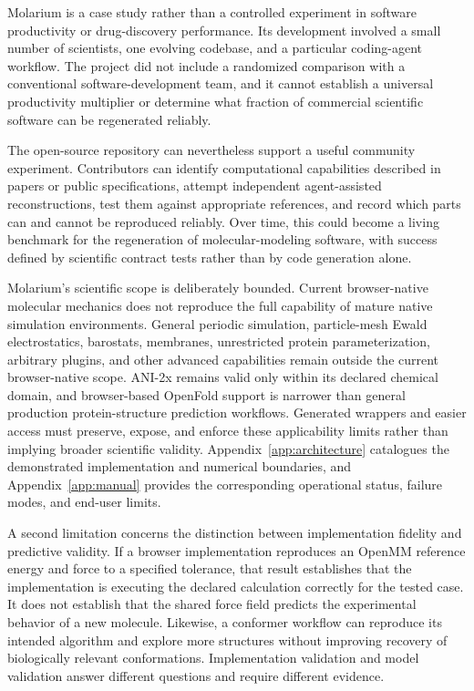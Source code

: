 \documentclass[11pt]{article}
\begin{document}
Molarium is a case study rather than a controlled experiment in software productivity or drug-discovery performance. Its development involved a small number of scientists, one evolving codebase, and a particular coding-agent workflow. The project did not include a randomized comparison with a conventional software-development team, and it cannot establish a universal productivity multiplier or determine what fraction of commercial scientific software can be regenerated reliably.

The open-source repository can nevertheless support a useful community experiment. Contributors can identify computational capabilities described in papers or public specifications, attempt independent agent-assisted reconstructions, test them against appropriate references, and record which parts can and cannot be reproduced reliably. Over time, this could become a living benchmark for the regeneration of molecular-modeling software, with success defined by scientific contract tests rather than by code generation alone.

Molarium's scientific scope is deliberately bounded. Current browser-native molecular mechanics does not reproduce the full capability of mature native simulation environments. General periodic simulation, particle-mesh Ewald electrostatics, barostats, membranes, unrestricted protein parameterization, arbitrary plugins, and other advanced capabilities remain outside the current browser-native scope. ANI-2x remains valid only within its declared chemical domain, and browser-based OpenFold support is narrower than general production protein-structure prediction workflows. Generated wrappers and easier access must preserve, expose, and enforce these applicability limits rather than implying broader scientific validity. Appendix~\ref{app:architecture} catalogues the demonstrated implementation and numerical boundaries, and Appendix~\ref{app:manual} provides the corresponding operational status, failure modes, and end-user limits.

A second limitation concerns the distinction between implementation fidelity and predictive validity. If a browser implementation reproduces an OpenMM reference energy and force to a specified tolerance, that result establishes that the implementation is executing the declared calculation correctly for the tested case. It does not establish that the shared force field predicts the experimental behavior of a new molecule. Likewise, a conformer workflow can reproduce its intended algorithm and explore more structures without improving recovery of biologically relevant conformations. Implementation validation and model validation answer different questions and require different evidence.
\end{document}

